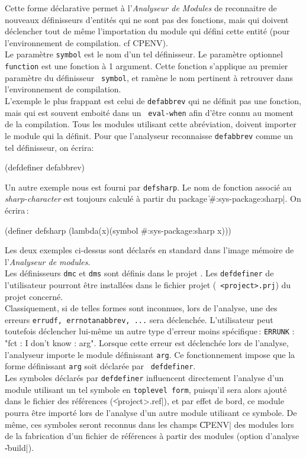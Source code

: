 Cette forme d\'{e}clarative permet \`{a} l'{\em Analyseur de Modules} de
reconnaitre de nouveaux d\'{e}finisseurs d'entit\'{e}s qui ne sont pas des
fonctions, mais qui doivent d\'{e}clencher tout de m\^{e}me l'importation du
module qui d\'{e}fini cette entit\'{e} (pour l'environnement
de compilation. cf CPENV). \\
Le param\`{e}tre {\tt symbol} est le nom d'un tel d\'{e}finisseur.
Le param\`{e}tre optionnel {\tt function} est une fonction \`{a} 1 argument.
Cette fonction s'applique au premier param\`{e}tre du d\'{e}finisseur {\tt
symbol}, et ram\`{e}ne le nom pertinent \`{a} retrouver dans l'environnement de
compilation.  \\
L'exemple le plus frappant est celui de {\tt defabbrev} qui ne d\'{e}finit
pas une fonction, mais qui est souvent emboit\'{e} dans un {\tt
eval-when} afin d'\^{e}tre connu au moment de la compilation. Tous les
modules utilisant cette abr\'{e}viation, doivent importer le module qui
la d\'{e}finit.
Pour que l'analyseur reconnaisse {\tt defabbrev} comme un tel
d\'{e}finisseur, on \'{e}crira:
\begin{Code*}
(defdefiner defabbrev)
\end{Code*}
Un autre exemple nous est fourni par {\tt defsharp}. Le nom de
fonction associ\'{e} au {\em sharp-character} est toujours calcul\'{e} \`{a}
partir du package \|#:sys-package:sharp|. On \'{e}crira\,:
\begin{Code*}
(definer defsharp (lambda(x)(symbol #:sys-package:sharp x)))
\end{Code*}
Les deux exemples ci-dessus sont d\'{e}clar\'{e}s en standard dans l'image
m\'{e}moire de l'{\em Analyseur de modules}. \\
Les d\'{e}finisseurs {\tt dmc} et {\tt dms} sont d\'{e}finis dans le projet
\LeLisp. Les {\tt defdefiner} de
l'utilisateur pourront \^{e}tre install\'{e}es dans le fichier projet ({\tt
<project>.prj}) du projet concern\'{e}. \\
Classiquement, si de telles formes sont inconnues, lors de l'analyse,
une des erreurs {\tt errudf, errnotanabbrev, ...} sera d\'{e}clench\'{e}e.
L'utilisateur peut toutefois d\'{e}clencher lui-m\^{e}me un autre type
d'erreur moins sp\'{e}cifique\,: {\tt ERRUNK} : "fct : I don't know :
arg". Lorsque  cette erreur est d\'{e}clench\'{e}e lors de l'analyse,
l'analyseur importe 
le module d\'{e}finissant {\tt arg}. Ce fonctionnement impose que la
forme d\'{e}finissant {\tt arg} soit d\'{e}clar\'{e}e par {\tt
defdefiner}.\\ 
Les symboles d\'{e}clar\'{e}s par {\tt defdefiner} influencent directement
l'analyse d'un module utilisant un tel symbole en {\tt toplevel form},
puisqu'il sera alors ajout\'{e} dans le fichier des r\'{e}f\'{e}rences
(\|<project>.ref|), et par effet de bord, ce module pourra \^{e}tre import\'{e}
lors de l'analyse d'un autre module utilisant ce symbole. De m\^{e}me,
ces symboles seront reconnus dans les champs \|CPENV| des modules lors
de la fabrication d'un fichier de r\'{e}f\'{e}rences \`{a} partir des modules
(option d'analyse \|-build|).

